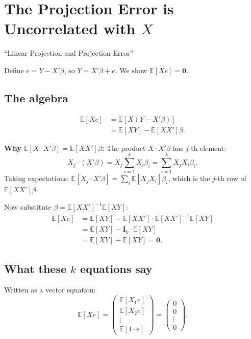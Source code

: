 \documentclass[12pt]{article}
\newcommand{\E}{\mathbb{E}}
\theoremstyle{definition}
\begin{document}
\section{The Projection Error is Uncorrelated with $X$}
\label{sec:orthogonality}

\begin{tcolorbox}[colback=blue!5, colframe=blue!50, title=Slide Reference]
``Linear Projection and Projection Error''
\end{tcolorbox}

Define $e = Y - X'\beta$, so $Y = X'\beta + e$. We show $\E[Xe] = \mathbf{0}$.

\subsection{The algebra}

\begin{align*}
\E[Xe] &= \E[X(Y - X'\beta)]\\
&= \E[XY] - \E[XX']\beta.
\end{align*}

\textbf{Why $\E[X \cdot X'\beta] = \E[XX']\beta$:} The product $X \cdot X'\beta$ has $j$-th element:
\[
X_j \cdot (X'\beta) = X_j \sum_{i=1}^k X_i \beta_i = \sum_{i=1}^k X_j X_i \beta_i.
\]
Taking expectations: $\E[X_j \cdot X'\beta] = \sum_i \E[X_j X_i]\beta_i$, which is the $j$-th row of $\E[XX']\beta$.

Now substitute $\beta = \E[XX']^{-1}\E[XY]$:
\begin{align*}
\E[Xe] &= \E[XY] - \E[XX'] \cdot \E[XX']^{-1}\E[XY]\\
&= \E[XY] - \mathbf{I}_k \cdot \E[XY]\\
&= \E[XY] - \E[XY] = \mathbf{0}.
\end{align*}

\subsection{What these $k$ equations say}

Written as a vector equation:
\[
\E[Xe] = \begin{pmatrix} \E[X_1 e] \\ \E[X_2 e] \\ \vdots \\ \E[1 \cdot e] \end{pmatrix} = \begin{pmatrix} 0 \\ 0 \\ \vdots \\ 0 \end{pmatrix}.
\]
\end{document}
